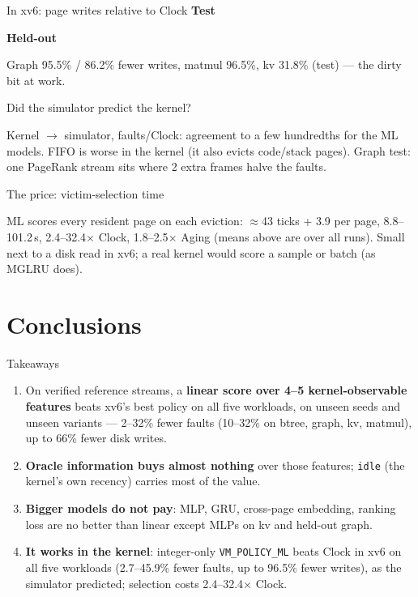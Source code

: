 \documentclass[10pt,aspectratio=169]{beamer}
\newcommand{\good}[1]{\textcolor{good}{#1}}
\newcommand{\warn}[1]{\textcolor{warn}{#1}}
\newcommand{\tbl}[1]{{\scriptsize}}
\newcommand{\wtbl}[1]{\resizebox{\textwidth}{!}{\scriptsize}}
\begin{document}
\begin{frame}{In xv6: page writes relative to Clock}
  \centering
  \textbf{\small Test}\\[2pt]\wtbl{kernel_writes_test}

  \medskip
  \textbf{\small Held-out}\\[2pt]\wtbl{kernel_writes_heldout}

  \medskip
  \small Graph \good{95.5\% / 86.2\% fewer writes}, matmul 96.5\%, kv 31.8\% (test) ---
  the dirty bit at work.
\end{frame}

\begin{frame}{Did the simulator predict the kernel?}
  \centering\resizebox{.72\textwidth}{!}{\scriptsize}

  \medskip
  \small Kernel $\to$ simulator, faults/Clock: \good{agreement to a few hundredths} for
  the ML models. FIFO is worse in the kernel (it also evicts code/stack pages).
  Graph test: one PageRank stream sits where 2 extra frames halve the faults.
\end{frame}

\begin{frame}{The price: victim-selection time}
  \centering\tbl{kernel_cost}

  \medskip
  \small ML scores every resident page on each eviction: $\approx$43 ticks + 3.9 per page,
  8.8--101.2\,\textmu s, \warn{2.4--32.4$\times$ Clock}, 1.8--2.5$\times$ Aging (means above are over all runs). Small next to a disk read
  in xv6; a real kernel would score a sample or batch (as MGLRU does).
\end{frame}

\section{Conclusions}

\begin{frame}{Takeaways}
  \small
  \begin{enumerate}
    \item On verified reference streams, a \textbf{linear score over 4--5
      kernel-observable features} beats xv6's best policy on all five workloads,
      on unseen seeds and unseen variants --- 2--32\% fewer faults (10--32\% on
      btree, graph, kv, matmul), up to 66\% fewer disk writes.
    \item \textbf{Oracle information buys almost nothing} over those features;
      \texttt{idle} (the kernel's own recency) carries most of the value.
    \item \textbf{Bigger models do not pay}: MLP, GRU, cross-page embedding, ranking loss
      are no better than linear except MLPs on kv and held-out graph.
    \item \textbf{It works in the kernel}: integer-only \texttt{VM\_POLICY\_ML} beats Clock
      in xv6 on all five workloads (2.7--45.9\% fewer faults, up to 96.5\% fewer writes), as the
      simulator predicted; selection costs 2.4--32.4$\times$ Clock.
  \end{enumerate}
\end{frame}
\end{document}
